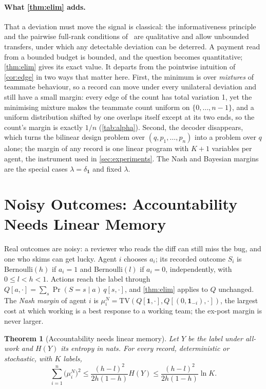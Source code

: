 \documentclass[sigconf,anonymous,acmthm=false]{acmart}
\theoremstyle{acmplain}
\newtheorem{theorem}{Theorem}
\theoremstyle{acmdefinition}
\newcommand{\TV}{\mathrm{TV}}
\begin{document}
\paragraph{What \cref{thm:elim} adds.} That a deviation must move the signal is classical:
the informativeness principle~\cite{holmstrom1979moral} and the pairwise full-rank
conditions of~\cite{fudenberg1994folk} are qualitative and allow unbounded transfers, under
which any detectable deviation can be deterred. A payment read from a bounded budget is
bounded, and the question becomes quantitative; \cref{thm:elim} gives its exact value. It
departs from the pointwise intuition of \cref{cor:edge} in two ways that matter here. First,
the minimum is over \emph{mixtures} of teammate behaviour, so a record can move under every
unilateral deviation and still have a small margin: every edge of the count has total
variation 1, yet the minimising mixture makes the teammate count uniform on
$\{0,\dots,n-1\}$, and a uniform distribution shifted by one overlaps itself except at its
two ends, so the count's margin is exactly $1/n$ (\cref{tab:alpha}). Second, the decoder
disappears, which turns the bilinear design problem over $(q,p_1,\dots,p_n)$ into a problem
over $q$ alone; the margin of any record is one linear program with $K+1$ variables per
agent, the instrument used in \cref{sec:experiments}. The Nash and Bayesian margins are the
special cases $\lambda=\delta_{\mathbf1}$ and fixed $\lambda$.

\section{Noisy Outcomes: Accountability Needs Linear Memory}\label{sec:noisy}

Real outcomes are noisy: a reviewer who reads the diff can still miss the bug, and one who
skims can get lucky. Agent $i$ chooses $a_i$; its recorded outcome $S_i$ is Bernoulli$(h)$ if
$a_i=1$ and Bernoulli$(l)$ if $a_i=0$, independently, with $0\le l<h<1$. Actions reach the
label through $Q[a,\cdot]=\sum_s\Pr(S=s\mid a)\,q[s,\cdot]$, and \cref{thm:elim} applies to
$Q$ unchanged. The \emph{Nash margin} of agent $i$ is
$\mu_i^N=\TV(Q[\mathbf1,\cdot],Q[(0,\mathbf1_{-i}),\cdot])$, the largest cost at which
working is a best response to a working team; the ex-post margin is never larger.

\begin{theorem}[Accountability needs linear memory]\label{thm:noisy}
Let $Y$ be the label under all-work and $H(Y)$ its entropy in nats. For every record,
deterministic or stochastic, with $K$ labels,
\[ \sum_{i=1}^n\big(\mu_i^N\big)^2\le\frac{(h-l)^2}{2h(1-h)}H(Y)\le\frac{(h-l)^2}{2h(1-h)}\ln K. \]
\end{theorem}
\end{document}

